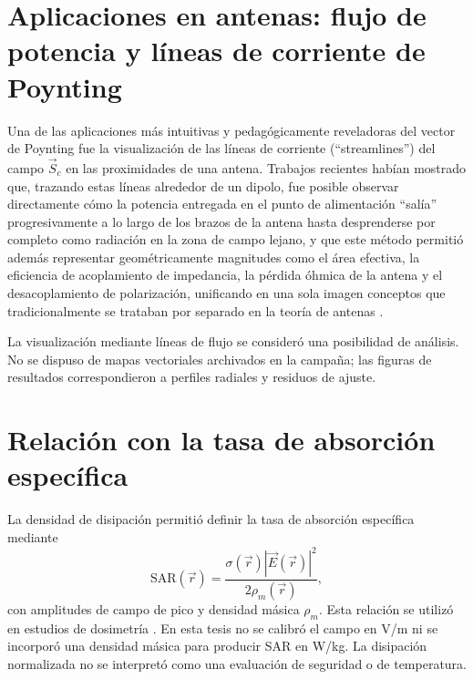 \section{Aplicaciones en antenas: flujo de potencia y líneas de corriente de Poynting}
Una de las aplicaciones más intuitivas y pedagógicamente reveladoras del vector de Poynting fue la visualización de las líneas de corriente (``streamlines'') del campo $\vec{S}_c$ en las proximidades de una antena. Trabajos recientes habían mostrado que, trazando estas líneas alrededor de un dipolo, fue posible observar directamente cómo la potencia entregada en el punto de alimentación ``salía'' progresivamente a lo largo de los brazos de la antena hasta desprenderse por completo como radiación en la zona de campo lejano, y que este método permitió además representar geométricamente magnitudes como el área efectiva, la eficiencia de acoplamiento de impedancia, la pérdida óhmica de la antena y el desacoplamiento de polarización, unificando en una sola imagen conceptos que tradicionalmente se trataban por separado en la teoría de antenas \cite{Diao2023}.

La visualización mediante líneas de flujo se consideró una posibilidad de análisis. No se dispuso de mapas vectoriales archivados en la campaña; las figuras de resultados correspondieron a perfiles radiales y residuos de ajuste.

\section{Relación con la tasa de absorción específica}
La densidad de disipación permitió definir la tasa de absorción específica mediante
\begin{equation}
\mathrm{SAR}(\vec r)=\frac{\sigma(\vec r)|\vec E(\vec r)|^2}{2\rho_m(\vec r)},
\end{equation}
con amplitudes de campo de pico y densidad másica $\rho_m$. Esta relación se utilizó en estudios de dosimetría \citep{Bhosale2024,Rashed2020}. En esta tesis no se calibró el campo en V/m ni se incorporó una densidad másica para producir SAR en W/kg. La disipación normalizada no se interpretó como una evaluación de seguridad o de temperatura.

